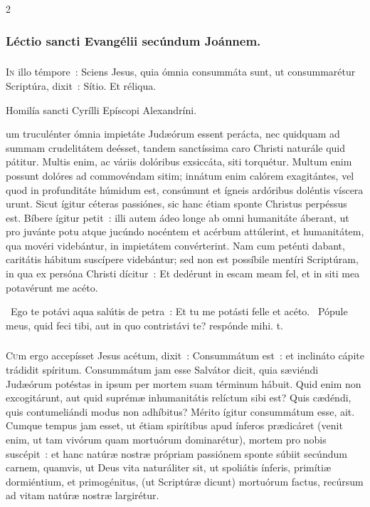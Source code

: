 \documentclass[9pt,twoside]{extarticle}
\begin{document}
\begin{multicols}{2}
{\subsubsection*{\center Léctio sancti Evangélii secúndum Joánnem.}
\subsubsection*{\center {}}
\lettrine{I}n illo témpore~: Sciens Jesus, quia ómnia consummáta sunt, ut consummarétur Scriptúra, dixit~: Sítio. Et réliqua.

\begin{center}Homilía sancti Cyrílli Epíscopi Alexandríni.\\
\end{center}
um truculénter ómnia impietáte Judæórum essent perácta, nec quidquam ad summam crudelitátem deésset, tandem sanctíssima caro Christi naturále quid pátitur. Multis enim, ac váriis dolóribus exsiccáta, siti torquétur. Multum enim possunt dolóres ad commovéndam sitim; innátum enim calórem exagitántes, vel quod in profunditáte húmidum est, consúmunt et ígneis ardóribus doléntis víscera urunt. Sicut ígitur céteras passiónes, sic hanc étiam sponte Christus perpéssus est. Bíbere ígitur petit~: illi autem ádeo longe ab omni humanitáte áberant, ut pro juvánte potu atque jucúndo nocéntem et acérbum attúlerint, et humanitátem, qua movéri videbántur, in impietátem convérterint. Nam cum peténti dabant, caritátis hábitum suscípere videbántur; sed non est possíbile mentíri Scriptúram, in qua ex persóna Christi dícitur~: Et dedérunt in escam meam fel, et in siti mea potavérunt me acéto.

\begin{tightlist}{}
\item {}~Ego te potávi aqua salútis de petra~: \textred{*} Et tu me potásti felle et acéto. ~Pópule meus, quid feci tibi, aut in quo contristávi te? respónde mihi. t.
\end{tightlist}

\subsubsection*{\center{}}
\lettrine{C}um ergo accepísset Jesus acétum, dixit~: Consummátum est~: et inclináto cápite trádidit spíritum. Consummátum jam esse Salvátor dicit, quia sæviéndi Judæórum potéstas in ipsum per mortem suam términum hábuit. Quid enim non excogitárunt, aut quid suprémæ inhumanitátis relíctum sibi est? Quis cædéndi, quis contumeliándi modus non adhíbitus? Mérito ígitur consummátum esse, ait. Cumque tempus jam esset, ut étiam spirítibus apud ínferos prædicáret (venit enim, ut tam vivórum quam mortuórum dominarétur), mortem pro nobis suscépit~: et hanc natúræ nostræ própriam passiónem sponte súbiit secúndum carnem, quamvis, ut Deus vita naturáliter sit, ut spoliátis ínferis, primítiæ dormiéntium, et primogénitus, (ut Scriptúræ dicunt) mortuórum factus, recúrsum ad vitam natúræ nostræ largirétur.

}
\end{multicols}
\end{document}
